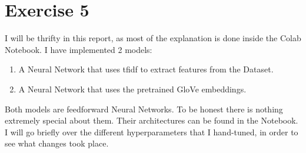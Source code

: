 \documentclass[12pt]{report}
\begin{document}
\section*{Exercise 5}
I will be thrifty in this report, as most of the explanation is done inside the
Colab Notebook. I have implemented 2 models:
\begin{enumerate}
    \item A Neural Network that uses tfidf to extract features from the Dataset.
    \item A Neural Network that uses the pretrained GloVe embeddings. 
\end{enumerate}

Both models are feedforward Neural Networks. To be honest there is nothing
extremely special about them. Their architectures can be found in the Notebook.
I will go briefly over the different hyperparameters that I hand-tuned, in order
to see what changes took place.

\end{document}
